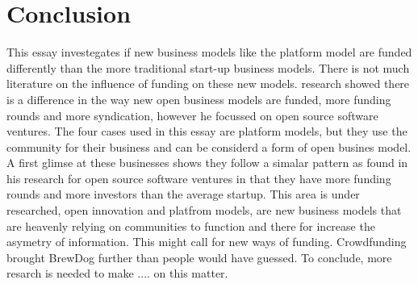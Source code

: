 \documentclass[a4paper, 11pt]{article}
\begin{document}
\section{Conclusion}
This essay investegates if new business models like the platform model are funded differently than the more traditional start-up business models. There is not much literature on the influence of funding on these new models. \cite{colombo2016open} research showed there is a difference in the way new open business models are funded, more funding rounds and more syndication, however he focussed on open source software ventures. The four cases used in this essay are platform models, but they use the community for their business and can be considerd a form of open busines model. A first glimse at these businesses shows they follow a simalar pattern as \cite{colombo2016open} found in his research for open source software ventures in that they have more funding rounds and more investors than the average startup.  
This area is under researched, open innovation and platfrom models, are new business models that are heavenly relying on communities to function and there for increase the asymetry of information. This might call for new ways of funding. Crowdfunding brought BrewDog further than people would have guessed. To conclude, more resarch is needed to make .... on this matter.

\renewcommand{\textbf}{}
\renewcommand{\bf}{}
{}
\end{document}
